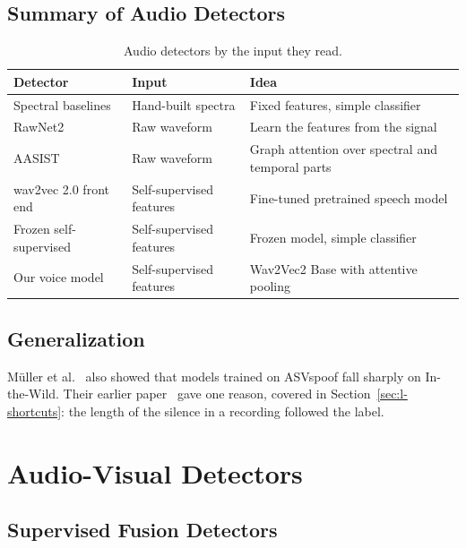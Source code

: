 \subsection{Summary of Audio Detectors}

\begin{table}[ht]
    \centering
    \small
    \caption{Audio detectors by the input they read.}
    \label{tab:audio}
    \begin{tabularx}{\textwidth}{@{}l l >{\raggedright\arraybackslash}X@{}}
        \toprule
        \textbf{Detector} & \textbf{Input} & \textbf{Idea} \\
        \midrule
        Spectral baselines~\cite{asvspoof2019} & Hand-built spectra & Fixed features, simple classifier \\
        RawNet2~\cite{rawnet2} & Raw waveform & Learn the features from the signal \\
        AASIST~\cite{aasist} & Raw waveform & Graph attention over spectral and temporal parts \\
        wav2vec 2.0 front end~\cite{tak2022} & Self-supervised features & Fine-tuned pretrained speech model \\
        Frozen self-supervised~\cite{pascu2024} & Self-supervised features & Frozen model, simple classifier \\
        Our voice model & Self-supervised features & Wav2Vec2 Base with attentive pooling \\
        \bottomrule
    \end{tabularx}
\end{table}

\subsection{Generalization}

M\"uller et al.~\cite{mueller2022} also showed that models trained on ASVspoof
fall sharply on In-the-Wild. Their earlier paper~\cite{mueller2021} gave one
reason, covered in Section~\ref{sec:l-shortcuts}: the length of the silence
in a recording followed the label.

\section{Audio-Visual Detectors}
\label{sec:l-av}

\subsection{Supervised Fusion Detectors}

